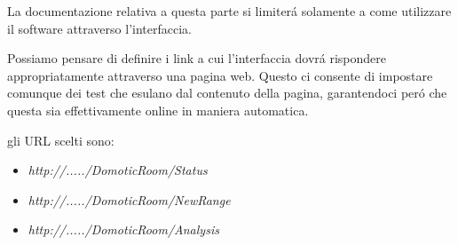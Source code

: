 La documentazione relativa a questa parte si limiter\'a solamente a come utilizzare il software attraverso l'interfaccia.

Possiamo pensare di definire i link a cui l'interfaccia dovr\'a rispondere appropriatamente attraverso una pagina web. Questo ci consente di impostare comunque dei test che esulano dal contenuto della pagina, garantendoci per\'o che questa sia effettivamente online in maniera automatica.

gli URL scelti sono:
\begin{itemize}
  \item \textit{http://...../DomoticRoom/Status}
  \item \textit{http://...../DomoticRoom/NewRange}
  \item \textit{http://...../DomoticRoom/Analysis}
\end{itemize}
